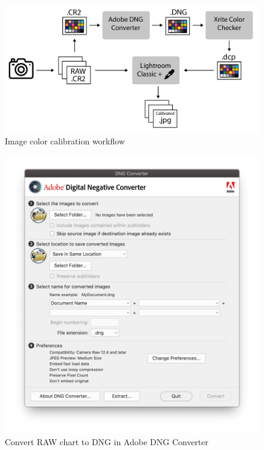 \documentclass[
]{book}
\begin{document}
\begin{figure}

{\centering \includegraphics[width=0.8\linewidth]{Figures/manual_method} 

}

\caption{Image color calibration workflow}\label{fig:ColorCheckerworkflow}
\end{figure}

\begin{figure}

{\centering \includegraphics[width=0.8\linewidth]{Figures/DNGConverter} 

}

\caption{Convert RAW chart to DNG in Adobe DNG Converter}\label{fig:DNG}
\end{figure}
\end{document}
